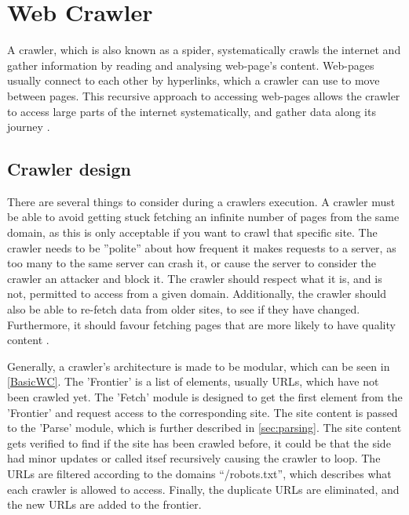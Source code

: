 \section{Web Crawler}\label{subsec:crawler}
A crawler, which is also known as a spider, systematically crawls the internet
and gather information by reading and analysing web-page's content. Web-pages
usually connect to each other by hyperlinks, which a crawler can use to move
between pages. This recursive approach to accessing web-pages allows the crawler
to access large parts of the internet systematically, and gather data along its
journey \citep[Ch20.2, P.444-445]{manning2008introduction}.

\subsection{Crawler design} 
There are several things to consider during a crawlers execution. A crawler must
be able to avoid getting stuck fetching an infinite number of pages from the
same domain, as this is only acceptable if you want to crawl that specific site.
The crawler needs to be ''polite'' about how frequent it makes requests to a
server, as too many to the same server can crash it, or cause the server to
consider the crawler an attacker and block it. The crawler should respect what
it is, and is not, permitted to access from a given domain. Additionally, the
crawler should also be able to re-fetch data from older sites, to see if they
have changed. Furthermore, it should favour fetching pages that are more
likely to have quality content \citep[Ch.20.1]{manning2008introduction}.\nl

Generally, a crawler's architecture is made to be modular, which can be seen in
\autoref{BasicWC}. The 'Frontier' is a list of elements, usually URLs, which
have not been crawled yet. The 'Fetch' module is designed to get the first
element from the 'Frontier' and request access to the corresponding site. The
site content is passed to the 'Parse' module, which is further described in
\autoref{sec:parsing}. The site content gets verified to find if the site has
been crawled before, it could be that the side had minor updates or called
itsef recursively causing the crawler to loop.
The URLs are filtered according to the domains ``/robots.txt'', which describes
what each crawler is allowed to access. Finally, the duplicate URLs are
eliminated, and the new URLs are added to the frontier.\nl%



